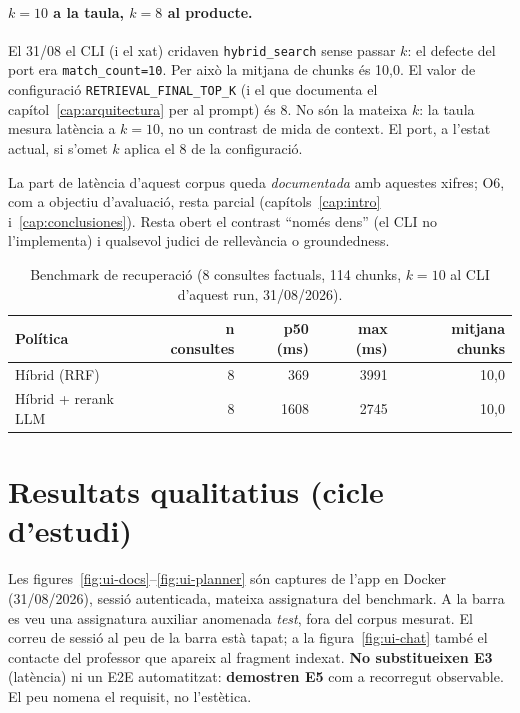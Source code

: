 \paragraph{$k=10$ a la taula, $k=8$ al producte.}
El 31/08 el CLI (i el xat) cridaven \texttt{hybrid\_search} sense passar $k$: el defecte del port era \texttt{match\_count=10}. Per això la mitjana de chunks és 10,0. El valor de configuració \texttt{RETRIEVAL\_FINAL\_TOP\_K} (i el que documenta el capítol~\ref{cap:arquitectura} per al prompt) és 8. No són la mateixa $k$: la taula mesura latència a $k=10$, no un contrast de mida de context. El port, a l'estat actual, si s'omet $k$ aplica el 8 de la configuració.

La part de latència d'aquest corpus queda \emph{documentada} amb aquestes xifres; O6, com a objectiu d'avaluació, resta parcial (capítols~\ref{cap:intro} i~\ref{cap:conclusiones}). Resta obert el contrast ``només dens'' (el CLI no l'implementa) i qualsevol judici de rellevància o groundedness.

\begin{table}[htbp]
\centering
\caption{Benchmark de recuperació (8 consultes factuals, 114 chunks, $k=10$ al CLI d'aquest run, 31/08/2026).}
\label{tab:bench}
\begin{tabular}{lrrrr}
\toprule
Política & n consultes & p50 (ms) & max (ms) & mitjana chunks \\
\midrule
Híbrid (RRF) & 8 & 369 & 3991 & 10,0 \\
Híbrid + rerank LLM & 8 & 1608 & 2745 & 10,0 \\
\bottomrule
\end{tabular}
\end{table}

\section{Resultats qualitatius (cicle d'estudi)}
\label{sec:cicle-ui}

Les figures~\ref{fig:ui-docs}--\ref{fig:ui-planner} són captures de l'app en Docker (31/08/2026), sessió autenticada, mateixa assignatura del benchmark. A la barra es veu una assignatura auxiliar anomenada \emph{test}, fora del corpus mesurat. El correu de sessió al peu de la barra està tapat; a la figura~\ref{fig:ui-chat} també el contacte del professor que apareix al fragment indexat. \textbf{No substitueixen E3} (latència) ni un E2E automatitzat: \textbf{demostren E5} com a recorregut observable. El peu nomena el requisit, no l'estètica.

